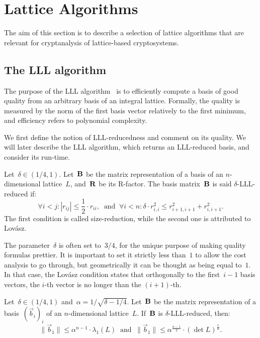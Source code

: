 \section{Lattice Algorithms}
\label{se:algs}

The aim of this section is to describe a selection of lattice algorithms that are 
relevant for cryptanalysis of lattice-based cryptosystems. 

\subsection{The LLL algorithm} 

The purpose of the LLL algorithm~\cite{LeLeLo82} is to efficiently compute a basis of good quality from an arbitrary basis of an integral lattice. Formally, the quality is measured by the norm of the first  basis vector relatively to the first minimum, and efficiency refers to polynomial complexity. 

We first define the notion of LLL-reducedness and comment on its quality. We will later describe the LLL algorithm, which returns an LLL-reduced basis, and consider its run-time. 

\begin{definition}
\label{def:lll}
Let~$\delta \in (1/4,1)$. 
Let~${\bf B}$ be the matrix representation of a basis of an $n$-dimensional  lattice~$L$, and~${\bf R}$ be its R-factor. 
The basis matrix~${\bf B}$ is said $\delta$-LLL-reduced if:
\[
\forall i<j: |r_{ij}| \leq \frac{1}{2}\cdot  r_{ii}, \ \text{ and } \ \forall i <n: \delta \cdot r_{i,i}^2 \leq  r_{i+1,i+1}^2+r_{i,i+1}^2.   
\]
The first condition is called size-reduction, while the second one is attributed to Lov\'asz. 
\end{definition}

The parameter~$\delta$ is often set to~$3/4$, for the unique purpose of making quality formulas prettier. It is important to set 
it strictly less than~$1$ to allow the cost analysis to go through, but geometrically it can be thought as being equal to~$1$. In that 
case,  the Lov\'asz condition states that orthogonally to the first~$i-1$ basis vectors, the $i$-th vector is no longer than the $(i+1)$-th.

\begin{lemma}
\label{def:lll}
Let~$\delta \in (1/4,1)$ and~$\alpha = 1/\sqrt{\delta-1/4}$. 
Let~${\bf B}$ be the matrix representation of a basis~$(\vec{b}_i)_i$ of an $n$-dimensional  lattice~$L$. If~${\bf B}$ is $\delta$-LLL-reduced, then: 
\[
\|\vec{b}_1\| \leq \alpha^{n-1} \cdot \lambda_1(L) \ \mbox{ and } \ \|\vec{b}_1\| \leq \alpha^{\frac{n-1}{2}} \cdot (\det L)^{\frac{1}{n}} .   
\]
\end{lemma}


